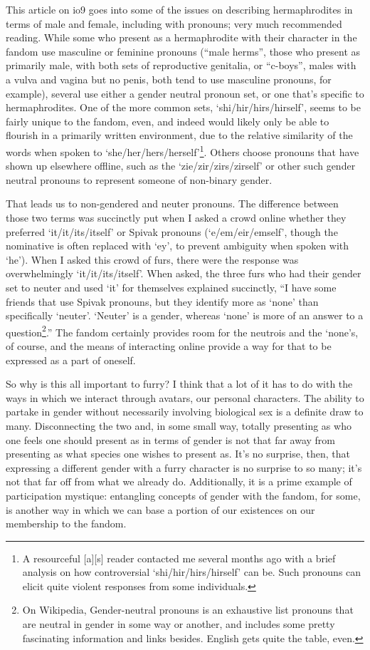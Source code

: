 This article on io9 goes into some of the issues on describing hermaphrodites in terms of male and female, including with pronouns; very much recommended reading.  While some who present as a hermaphrodite with their character in the fandom use masculine or feminine pronouns (``male herms'', those who present as primarily male, with both sets of reproductive genitalia, or ``c-boys'', males with a vulva and vagina but no penis, both tend to use masculine pronouns, for example), several use either a gender neutral pronoun set, or one that's specific to hermaphrodites. One of the more common sets, `shi/hir/hirs/hirself', seems to be fairly unique to the fandom, even, and indeed would likely only be able to flourish in a primarily written environment, due to the relative similarity of the words when spoken to `she/her/hers/herself'\footnote{A resourceful [a][s] reader contacted me several months ago with a brief analysis on how controversial `shi/hir/hirs/hirself' can be.  Such pronouns can elicit quite violent responses from some individuals.}.  Others choose pronouns that have shown up elsewhere offline, such as the `zie/zir/zirs/zirself' or other such gender neutral pronouns to represent someone of non-binary gender.

That leads us to non-gendered and neuter pronouns.  The difference between those two terms was succinctly put when I asked a crowd online whether they preferred `it/it/its/itself' or Spivak pronouns (`e/em/eir/emself', though the nominative is often replaced with `ey', to prevent ambiguity when spoken with `he').  When I asked this crowd of furs, there were the response was overwhelmingly `it/it/its/itself'.  When asked, the three furs who had their gender set to neuter and used `it' for themselves explained succinctly, ``I have some friends that use Spivak pronouns, but they identify more as `none' than specifically `neuter'.  `Neuter' is a gender, whereas `none' is more of an answer to a question\footnote{On Wikipedia, Gender-neutral pronouns is an exhaustive list pronouns that are neutral in gender in some way or another, and includes some pretty fascinating information and links besides.  English gets quite the table, even.}.''  The fandom certainly provides room for the neutrois and the `none's, of course, and the means of interacting online provide a way for that to be expressed as a part of oneself.

So why is this all important to furry?  I think that a lot of it has to do with the ways in which we interact through avatars, our personal characters.   The ability to partake in gender without necessarily involving biological sex is a definite draw to many.  Disconnecting the two and, in some small way, totally presenting as who one feels one should present as in terms of gender is not that far away from presenting as what species one wishes to present as.  It's no surprise, then, that expressing a different gender with a furry character is no surprise to so many; it's not that far off from what we already do.  Additionally, it is a prime example of participation mystique: entangling concepts of gender with the fandom, for some, is another way in which we can base a portion of our existences on our membership to the fandom.


